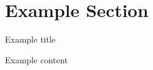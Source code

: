\section{Example Section }

\begin{frame}[fragile]{Example title}

    Example content
\end{frame}

